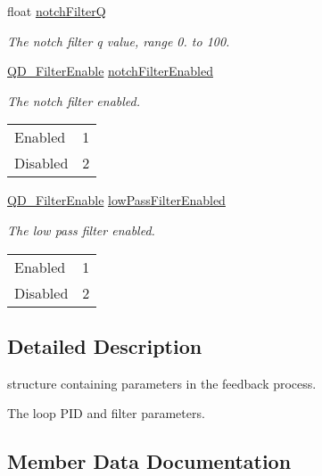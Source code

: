 \begin{DoxyCompactItemize}
float \hyperlink{struct_q_d___loop_parameters_a6686ff851386546ba108ec42c73769e7}{notch\+FilterQ}
\begin{DoxyCompactList}\small\item\em The notch filter q value, range 0. to 100. \end{DoxyCompactList}\item 
\hyperlink{group___t_cube_quad_gaf9cb69779549db4792c4e647b69eb29f}{Q\+D\+\_\+\+Filter\+Enable} \hyperlink{struct_q_d___loop_parameters_ac41734cc5dcf819b94a7062d484a095d}{notch\+Filter\+Enabled}
\begin{DoxyCompactList}\small\item\em The notch filter enabled. \tabulinesep=1mm
\begin{longtabu} spread 0pt [c]{*2{|X[-1]}|}
\hline
Enabled&1 \\
Disabled&2 \\
\end{longtabu}
\end{DoxyCompactList}\item 
\hyperlink{group___t_cube_quad_gaf9cb69779549db4792c4e647b69eb29f}{Q\+D\+\_\+\+Filter\+Enable} \hyperlink{struct_q_d___loop_parameters_ab4031d99f00137729efdcbf3a333a915}{low\+Pass\+Filter\+Enabled}
\begin{DoxyCompactList}\small\item\em The low pass filter enabled. \tabulinesep=1mm
\begin{longtabu} spread 0pt [c]{*2{|X[-1]}|}
\hline
Enabled&1 \\
Disabled&2 \\
\end{longtabu}
\end{DoxyCompactList}\end{DoxyCompactItemize}


\subsection{Detailed Description}
structure containing parameters in the feedback process. 

The loop P\+ID and filter parameters. 

\subsection{Member Data Documentation}
